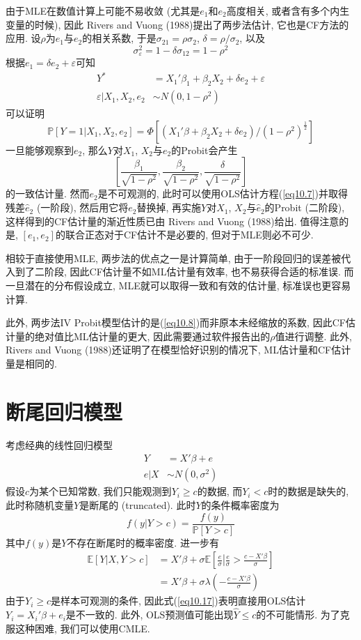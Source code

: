 \documentclass[cn, 12pt, math=mtpro2, bibstyle=apa, blue, twocol]{elegantbook}
\newcommand{\E}{\mathbb{E}}
\newcommand{\PP}{\mathbb{P}}
\begin{document}
由于MLE在数值计算上可能不易收敛 (尤其是$e_1$和$e_2$高度相关, 或者含有多个内生变量的时候), 因此 Rivers and Vuong (1988)提出了两步法估计, 它也是CF方法的应用. 设$\rho$为$e_1$与$e_2$的相关系数, 于是$\sigma_{21}=\rho\sigma_2$, $\delta=\rho/\sigma_2$, 以及
$$\sigma_\varepsilon^2=1-\delta\sigma_{12}=1-\rho^2$$
根据$e_1=\delta e_2+\varepsilon$可知
\begin{align*}
Y^\ast&=X_1'\beta_1+\beta_2X_2+\delta e_2+\varepsilon \\
\varepsilon|X_1, X_2, e_2&\sim N(0,1-\rho^2)
\end{align*}
可以证明
$$\PP[Y=1|X_1,X_2,e_2]=\Phi[(X_1'\beta+\beta_2X_2+\delta e_2)/(1-\rho^2)^{\frac{1}{2}}]$$
一旦能够观察到$e_2$, 那么$Y$对$X_1$, $X_2$与$e_2$的Probit会产生
\begin{equation}\label{eq10.8}
  \left[\frac{\beta_1}{\sqrt{1-\rho^2}},\frac{\beta_2}{\sqrt{1-\rho^2}},\frac{\delta}{\sqrt{1-\rho^2}}\right]
\end{equation}
的一致估计量. 然而$e_2$是不可观测的, 此时可以使用OLS估计方程(\ref{eq10.7})并取得残差$\hat{e}_2$ (一阶段), 然后用它将$e_2$替换掉, 再实施$Y$对$X_1$, $X_2$与$\hat{e}_2$的Probit (二阶段), 这样得到的CF估计量的渐近性质已由 Rivers and Vuong (1988)给出. 值得注意的是, $[e_1,e_2]$的联合正态对于CF估计不是必要的, 但对于MLE则必不可少.

相较于直接使用MLE, 两步法的优点之一是计算简单, 由于一阶段回归的误差被代入到了二阶段, 因此CF估计量不如ML估计量有效率, 也不易获得合适的标准误. 而一旦潜在的分布假设成立, MLE就可以取得一致和有效的估计量, 标准误也更容易计算.

此外, 两步法IV Probit模型估计的是(\ref{eq10.8})而非原本未经缩放的系数, 因此CF估计量的绝对值比ML估计量的更大, 因此需要通过软件报告出的$\rho$值进行调整. 此外, Rivers and Vuong (1988)还证明了在模型恰好识别的情况下, ML估计量和CF估计量是相同的.

\section{断尾回归模型}
考虑经典的线性回归模型
\begin{align*}
Y&=X'\beta+e \\
e|X&\sim N(0,\sigma^2)
\end{align*}
假设$c$为某个已知常数, 我们只能观测到$Y_i\geq c$的数据, 而$Y_i<c$时的数据是缺失的, 此时称随机变量$Y$是断尾的 (truncated). 此时$Y$的条件概率密度为
\begin{equation}\label{eq10.18}
  f(y|Y>c)=\frac{f(y)}{\PP[Y>c]}
\end{equation}
其中$f(y)$是$Y$不存在断尾时的概率密度. 进一步有
\begin{align}
\E[Y|X, Y>c]&=X'\beta+\sigma\E\left[\left.\frac{e}{\sigma}\right|\frac{e}{\sigma}>\frac{c-X'\beta}{\sigma}\right] \nonumber \\
&=X'\beta+\sigma\lambda\left(-\frac{c-X'\beta}{\sigma}\right) \label{eq10.17}
\end{align}
由于$Y_i\geq c$是样本可观测的条件, 因此式(\ref{eq10.17})表明直接用OLS估计$Y_i=X_i'\beta+e_i$是不一致的. 此外, OLS预测值可能出现$\hat{Y}\leq c$的不可能情形. 为了克服这种困难, 我们可以使用CMLE.
\end{document}
